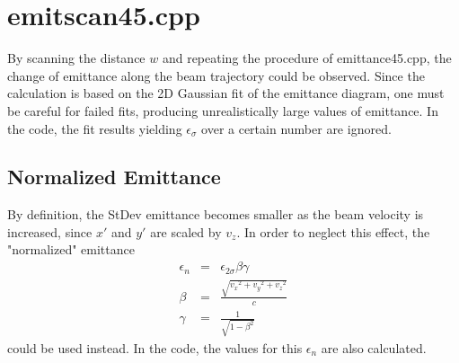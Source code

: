 \documentclass{article}
\begin{document}
\section{emitscan45.cpp}
By scanning the distance $w$ and repeating the procedure of emittance45.cpp, the change of emittance along the beam trajectory could be observed. Since the calculation is based on the 2D Gaussian fit of the emittance diagram, one must be careful for failed fits, producing unrealistically large values of emittance. In the code, the fit results yielding $\epsilon_{\sigma}$ over a certain number are ignored. 

\subsection{Normalized Emittance}
By definition, the StDev emittance becomes smaller as the beam velocity is increased, since $x'$ and $y'$ are scaled by $v_z$. In order to neglect this effect, the "normalized" emittance
\begin{eqnarray*}
\epsilon_n & = & \epsilon_{2\sigma} \beta \gamma \\
\beta & = & \frac{\sqrt{{v_x}^2 + {v_y}^2 + {v_z}^2}}{c} \\
\gamma & = & \frac{1}{\sqrt{1-\beta^2}}
\end{eqnarray*}
could be used instead. In the code, the values for this $\epsilon_n$ are also calculated.
\end{document}
